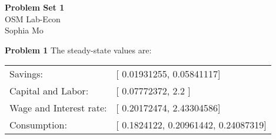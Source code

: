 \documentclass[letterpaper,12pt]{article}
\theoremstyle{definition}
\begin{document}
\begin{flushleft}
  \textbf{\large{Problem Set} 1} \\
  OSM Lab-Econ \\
  Sophia Mo
\end{flushleft}

\vspace{5mm}

\noindent\textbf{Problem 1}
The steady-state values are:\\
\begin{table}[htbp]
\begin{tabular}{ll}
Savings:&[ 0.01931255,  0.05841117]\\
Capital and Labor:&[ 0.07772372,  2.2       ]\\
Wage and Interest rate:&[ 0.20172474,  2.43304586]\\
Consumption:&[ 0.1824122,   0.20961442,  0.24087319]\\
\end{tabular}
\end{table}
\end{document}
